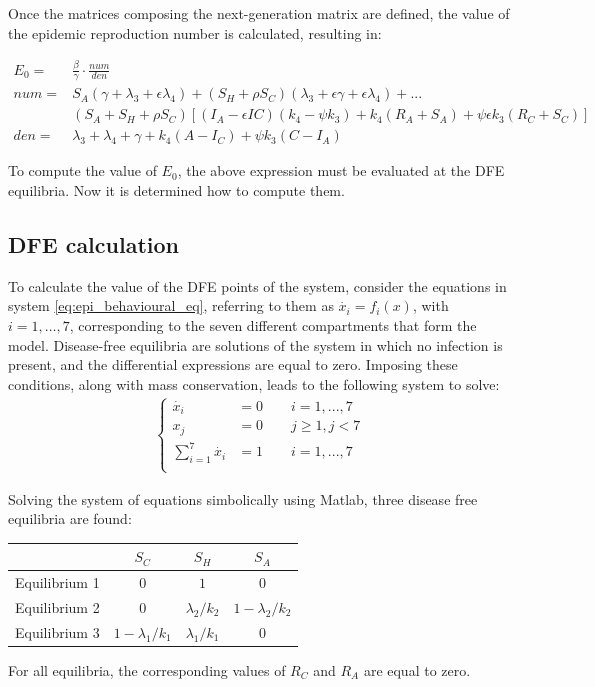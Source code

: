 Once the matrices composing the next-generation matrix are defined, the value of the epidemic reproduction number is calculated, resulting in:

\begin{equation}
	\begin{split}
		E_0 = &\frac{\beta}{\gamma} \cdot \frac{num}{den} \\
		num = &S_A(\gamma+\lambda_3+\epsilon \lambda_4)+ (S_H + \rho S_C)(\lambda_3+\epsilon \gamma+\epsilon \lambda_4) + ...\\
		& (S_A + S_H + \rho S_C)[(I_A-\epsilon IC)(k_4 - \psi k_3)+k_4(R_A+S_A)+\psi \epsilon k_3 (R_C+S_C)]\\
		den = &\lambda_3+\lambda_4+\gamma+k_4(A-I_C)+\psi k_3 (C-I_A)
	\end{split}
	\label{eq:epidemic_reproduction _number}
\end{equation}

To compute the value of $E_0$, the above expression must be evaluated at the DFE equilibria. Now it is determined how to compute them.

\subsection{DFE calculation}
To calculate the value of the DFE points of the system, consider the equations in system \ref{eq:epi_behavioural_eq}, referring to them as $\dot{x_i} = f_i(x)$, with $i = 1,\dots,7$, corresponding to the seven different compartments that form the model.
Disease-free equilibria are solutions of the system in which no infection is present, and the differential expressions are equal to zero. Imposing these conditions, along with mass conservation, leads to the following system to solve:
\begin{align*}
	\begin{cases} 
		\dot{x_i} &= 0  \quad \quad   i = 1,...,7\\
		x_j &= 0	\quad \quad	 j \ge 1, j <7	\\
		\sum_{i = 1}^{7} \dot{x_i}&= 1 \quad \quad i = 1,...,7 \\
	\end{cases}
	\label{eq:epi_behavioural_eq2}
\end{align*}

Solving the system of equations simbolically using Matlab, three disease free equilibria are found:
\begin{center}
\begin{tabular}{|c|c|c|c|}
	\hline
	& $S_C$ & $S_H$ & $S_A$ \\
	\hline
	Equilibrium 1 & $0$ & $1$ & $0$ \\
	\hline
	Equilibrium 2 & $0$ & $\lambda_2/k_2$ & $1- \lambda_2/k_2$ \\
	\hline
	Equilibrium 3 & $1 -\lambda_1/k_1$ & $\lambda_1/k_1$ & $0$ \\
	\hline
\end{tabular}
\end{center}
For all equilibria, the corresponding values of $R_C$ and $R_A$ are equal to zero.

